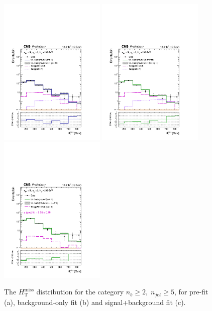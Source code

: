 \clearpage
\begin{figure}[tbhp]
    \caption{ 
    The $H_{\mathrm{T}}^{\mathrm{miss}}$ distribution for the category $n_{b}\geq 2, \; n_{jet} \geq 5$, for pre-fit (a), background-only fit (b) and signal+background fit (c).
    \label{fig:mhtShape_ge2b_ge5j} }
  \begin{center}
  \includegraphics[width=0.45\textwidth]{mhtShape_ge2b_ge5j_200_Inf_prefit_aux} \hspace{1cm}
  \includegraphics[width=0.45\textwidth]{mhtShape_ge2b_ge5j_200_Inf_fit_b_aux} \\
  \includegraphics[width=0.45\textwidth]{mhtShape_ge2b_ge5j_200_Inf_fit_s_aux}
  \end{center}
\end{figure}
